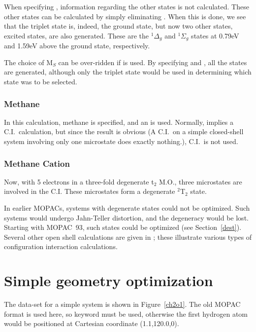 When specifying , information regarding the other states is not
calculated.  These other states can be calculated by simply eliminating
.  When this is done, we see that the triplet state is, indeed,
the ground state, but now two other states, excited states, are also
generated.  These are the $^1\Delta_g$ and $^1\Sigma_g$ states at 0.79eV and
1.59eV above the ground state, respectively.

The choice of  M$_S$ can be over-ridden if  is used.  By
specifying   and , all the states are generated,
although only the triplet state would be used in determining which state was to
be selected.

\subsubsection{Methane}
In this calculation, methane is specified, and an  is used.
Normally,  implies a C.I.\ calculation, but since
the result is obvious (A C.I.\ on a simple closed-shell system involving
only one microstate does exactly nothing.), C.I.\ is not used.
\subsubsection{Methane Cation}
Now, with 5 electrons in a three-fold degenerate t$_2$ M.O., three microstates
are involved in the C.I. These microstates form a degenerate $^2$T$_2$ state.

In earlier MOPACs, systems with degenerate states could not be optimized.  Such
systems would undergo Jahn-Teller distortion, and the degeneracy would be lost.
Starting with MOPAC~93, such states could be optimized (see Section~\ref{dest}).
Several other open shell calculations are given in ; these
illustrate various types of configuration interaction calculations.

\section{Simple geometry optimization}  
The data-set for a simple system is shown in Figure~\ref{ch2o1}.  The old MOPAC
format is used here, so keyword  must be used, otherwise the first
hydrogen atom would be positioned at Cartesian coordinate (1.1,120.0,0).

